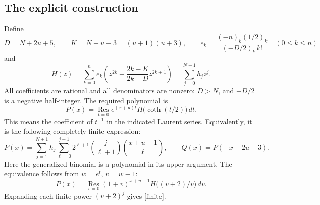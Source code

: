 \documentclass[11pt]{article}
\newcommand{\Res}{\operatorname*{Res}}
\begin{document}
\subsection*{The explicit construction}
Define
\[
 D=N+2u+5,\qquad K=N+u+3=(u+1)(u+3),\qquad
 e_k=\frac{(-n)_k(1/2)_k}{(-D/2)_k\,k!}\quad(0\le k\le n)
\]
and
\begin{equation}\label{H}
 H(z)=\sum_{k=0}^{n}e_k
       \left(z^{2k}+\frac{2k-K}{2k-D}z^{2k+1}\right)
      =\sum_{j=0}^{N+1}h_jz^j.
\end{equation}
All coefficients are rational and all denominators are nonzero:
\(D>N\), and \(-D/2\) is a negative half-integer.
The required polynomial is
\begin{equation}\label{res}
 P(x)=\Res_{t=0}
       e^{(x+u)t}H\bigl(\coth(t/2)\bigr)\,dt .
\end{equation}
This means the coefficient of \(t^{-1}\) in the indicated Laurent
series. Equivalently, it is the following completely finite expression:
\begin{equation}\label{finite}
 P(x)=\sum_{j=1}^{N+1}h_j
           \sum_{\ell=0}^{j-1}
           2^{\ell+1}\binom{j}{\ell+1}
                         \binom{x+u-1}{\ell},
 \qquad
 Q(x)=P(-x-2u-3).
\end{equation}
Here the generalized binomial is a polynomial in its upper argument.
The equivalence follows from \(w=e^t\), \(v=w-1\):
\[
 P(x)=\Res_{v=0}(1+v)^{x+u-1}
                 H\bigl((v+2)/v\bigr)\,dv.
\]
Expanding each finite power \((v+2)^j\) gives \eqref{finite}.
\end{document}
